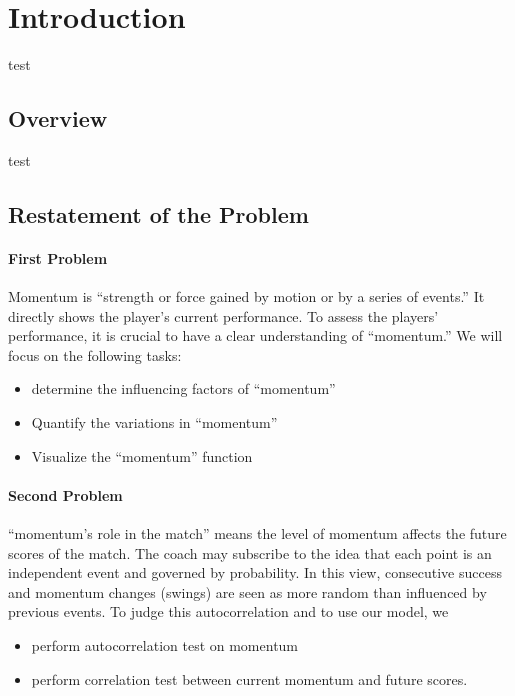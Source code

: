 \setcounter{page}{1}

\section{Introduction}

test

\subsection{Overview}

test

\subsection{Restatement of the Problem}

\paragraph{First Problem}

Momentum is “strength or force gained by motion or by a series of 
events.” It directly shows the player's current performance.
To assess the players' performance, it is crucial to have a clear understanding of ``momentum.'' 
We will focus on the following tasks: 
\begin{itemize}
    \item determine the influencing factors of ``momentum''
    \item Quantify the variations in ``momentum''
    \item Visualize the ``momentum'' function
\end{itemize}

\paragraph{Second Problem}

``momentum's role in the match'' means the level of momentum affects the future scores of the match.
The coach may subscribe to the idea that each point is an independent event and governed by probability.
In this view, consecutive success and momentum changes (swings) are seen as more random than influenced by previous events.
To judge this autocorrelation and to use our model, we 

\begin{itemize}
    \item perform autocorrelation test on momentum
    \item perform correlation test between current momentum and future scores.
\end{itemize}

